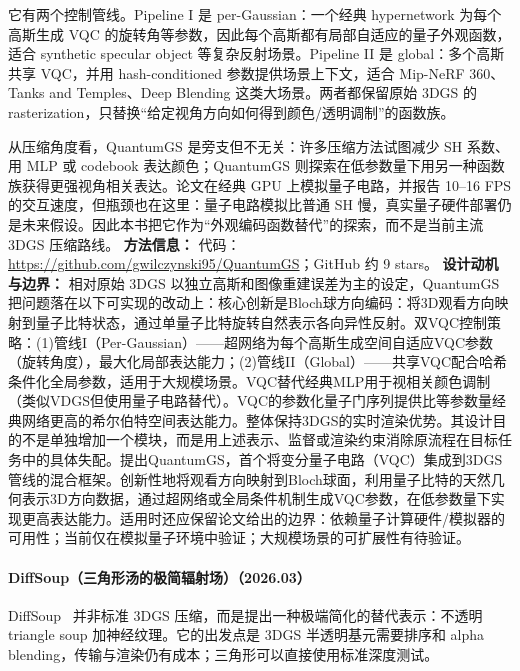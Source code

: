 它有两个控制管线。Pipeline I 是 per-Gaussian：一个经典 hypernetwork 为每个高斯生成 VQC 的旋转角等参数，因此每个高斯都有局部自适应的量子外观函数，适合 synthetic specular object 等复杂反射场景。Pipeline II 是 global：多个高斯共享 VQC，并用 hash-conditioned 参数提供场景上下文，适合 Mip-NeRF 360、Tanks and Temples、Deep Blending 这类大场景。两者都保留原始 3DGS 的 rasterization，只替换“给定视角方向如何得到颜色/透明调制”的函数族。

从压缩角度看，QuantumGS 是旁支但不无关：许多压缩方法试图减少 SH 系数、用 MLP 或 codebook 表达颜色；QuantumGS 则探索在低参数量下用另一种函数族获得更强视角相关表达。论文在经典 GPU 上模拟量子电路，并报告 10--16 FPS 的交互速度，但瓶颈也在这里：量子电路模拟比普通 SH 慢，真实量子硬件部署仍是未来假设。因此本书把它作为“外观编码函数替代”的探索，而不是当前主流 3DGS 压缩路线。
\textbf{方法信息：} 代码：\url{https://github.com/gwilczynski95/QuantumGS}；GitHub 约 9 stars。
\textbf{设计动机与边界：} 相对原始 3DGS 以独立高斯和图像重建误差为主的设定，QuantumGS 把问题落在以下可实现的改动上：核心创新是Bloch球方向编码：将3D观看方向映射到量子比特状态，通过单量子比特旋转自然表示各向异性反射。双VQC控制策略：(1)管线I（Per-Gaussian）——超网络为每个高斯生成空间自适应VQC参数（旋转角度），最大化局部表达能力；(2)管线II（Global）——共享VQC配合哈希条件化全局参数，适用于大规模场景。VQC替代经典MLP用于视相关颜色调制（类似VDGS但使用量子电路替代）。VQC的参数化量子门序列提供比等参数量经典网络更高的希尔伯特空间表达能力。整体保持3DGS的实时渲染优势。其设计目的不是单独增加一个模块，而是用上述表示、监督或渲染约束消除原流程在目标任务中的具体失配。提出QuantumGS，首个将变分量子电路（VQC）集成到3DGS管线的混合框架。创新性地将观看方向映射到Bloch球面，利用量子比特的天然几何表示3D方向数据，通过超网络或全局条件机制生成VQC参数，在低参数量下实现更高表达能力。适用时还应保留论文给出的边界：依赖量子计算硬件/模拟器的可用性；当前仅在模拟量子环境中验证；大规模场景的可扩展性有待验证。
\paragraph{DiffSoup（三角形汤的极简辐射场）（2026.03）}
DiffSoup~\cite{2603_27151} 并非标准 3DGS 压缩，而是提出一种极端简化的替代表示：不透明 triangle soup 加神经纹理。它的出发点是 3DGS 半透明基元需要排序和 alpha blending，传输与渲染仍有成本；三角形可以直接使用标准深度测试。

